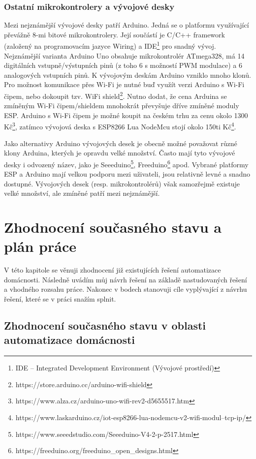 \subsection*{Ostatní mikrokontrolery a vývojové desky}
Mezi nejznámější vývojové desky patří Arduino. Jedná se o platformu využívající převážně 8-mi bitové mikrokontrolery. Její součástí je C/C++ framework (založený na programovacím jazyce Wiring) a IDE\footnote{IDE -- Integrated Development Environment (Vývojové prostředí)} pro snadný vývoj. Nejznámější varianta Arduino Uno obsahuje mikrokontrolér ATmega328, má 14 digitálních vstupně/výstupních pinů (z toho 6 s možností PWM modulace) a 6 analogových vstupních pinů. K vývojovým deskám Arduino vzniklo mnoho klonů. Pro možnost komunikace přes Wi-Fi je nutné buď využít verzi Arduino s Wi-Fi čipem, nebo dokoupit tzv. WiFi shield\footnote{https://store.arduino.cc/arduino-wifi-shield}. Nutno dodat, že cena Arduina se zmíněným Wi-Fi čipem/shieldem mnohokrát převyšuje dříve zmíněné moduly ESP. Arduino s Wi-Fi čipem je možné koupit na českém trhu za cenu okolo 1300 Kč\footnote{https://www.alza.cz/arduino-uno-wifi-rev2-d5655517.htm}, zatímco vývojová deska s ESP8266 Lua NodeMcu stojí okolo 150ti Kč\footnote{https://www.laskarduino.cz/iot-esp8266-lua-nodemcu-v2-wifi-modul--tcp-ip/}.

Jako alternativy Arduino vývojových desek je obecně možné považovat různé klony Arduina, kterých je opravdu velké množství. Často mají tyto vývojové desky i odvozený název, jako je Seeeduino\footnote{https://www.seeedstudio.com/Seeeduino-V4-2-p-2517.html}, Freeduino\footnote{https://freeduino.org/freeduino\_open\_designs.html} apod. Vybrané platformy ESP a Arduino mají velkou podporu mezi uživateli, jsou relativně levné a snadno dostupné. Vývojových desek (resp. mikrokontrolérů) však samozřejmě existuje velké množství, ale zmíněné patří mezi nejznámější.

\chapter{Zhodnocení současného stavu a plán práce}
V této kapitole se věnuji zhodnocení již existujících řešení automatizace domácnosti. Následně uvádím můj návrh řešení na základě nastudovaných řešení a vhodného rozsahu práce. Nakonec v bodech stanovuji cíle vyplývající z návrhu řešení, které se v práci snažím splnit.
\section{Zhodnocení současného stavu v oblasti automatizace domácnosti}

